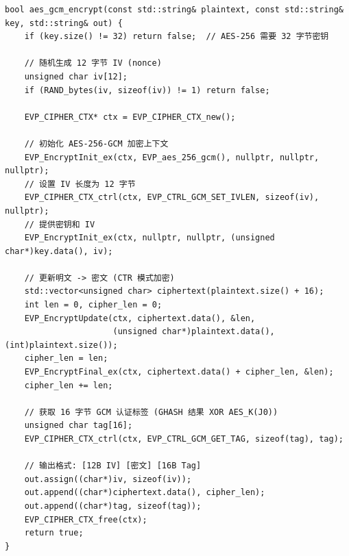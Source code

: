 \documentclass[12pt]{article}
\begin{document}
\begin{lstlisting}[caption={AES-256-GCM 加密 (utils.cpp)},label={lst:aes-enc}]
bool aes_gcm_encrypt(const std::string& plaintext, const std::string& key, std::string& out) {
    if (key.size() != 32) return false;  // AES-256 需要 32 字节密钥

    // 随机生成 12 字节 IV (nonce)
    unsigned char iv[12];
    if (RAND_bytes(iv, sizeof(iv)) != 1) return false;

    EVP_CIPHER_CTX* ctx = EVP_CIPHER_CTX_new();

    // 初始化 AES-256-GCM 加密上下文
    EVP_EncryptInit_ex(ctx, EVP_aes_256_gcm(), nullptr, nullptr, nullptr);
    // 设置 IV 长度为 12 字节
    EVP_CIPHER_CTX_ctrl(ctx, EVP_CTRL_GCM_SET_IVLEN, sizeof(iv), nullptr);
    // 提供密钥和 IV
    EVP_EncryptInit_ex(ctx, nullptr, nullptr, (unsigned char*)key.data(), iv);

    // 更新明文 -> 密文 (CTR 模式加密)
    std::vector<unsigned char> ciphertext(plaintext.size() + 16);
    int len = 0, cipher_len = 0;
    EVP_EncryptUpdate(ctx, ciphertext.data(), &len,
                      (unsigned char*)plaintext.data(), (int)plaintext.size());
    cipher_len = len;
    EVP_EncryptFinal_ex(ctx, ciphertext.data() + cipher_len, &len);
    cipher_len += len;

    // 获取 16 字节 GCM 认证标签 (GHASH 结果 XOR AES_K(J0))
    unsigned char tag[16];
    EVP_CIPHER_CTX_ctrl(ctx, EVP_CTRL_GCM_GET_TAG, sizeof(tag), tag);

    // 输出格式: [12B IV] [密文] [16B Tag]
    out.assign((char*)iv, sizeof(iv));
    out.append((char*)ciphertext.data(), cipher_len);
    out.append((char*)tag, sizeof(tag));
    EVP_CIPHER_CTX_free(ctx);
    return true;
}
\end{lstlisting}
\end{document}
